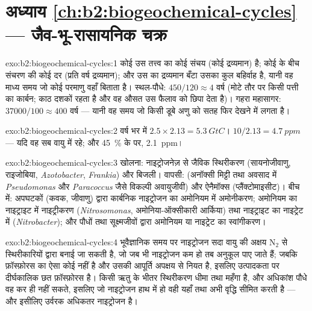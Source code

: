 \section*{अध्याय \ref{ch:b2:biogeochemical-cycles} --- जैव-भू-रासायनिक चक्र}

\begin{solution}{exo:b2:biogeochemical-cycles:1}
कोई  उस तत्त्व का कोई संचय (कोई द्रव्यमान) है; कोई 
 के बीच संचरण की कोई दर (प्रति वर्ष द्रव्यमान); और 
उस  का द्रव्यमान बँटा उसका कुल बहिर्वाह है, यानी वह माध्य समय जो कोई
परमाणु वहाँ बिताता है। स्थल-पौधे: $450/120 \approx 4$ वर्ष (मोटे तौर पर किसी पत्ती का
कार्बन; काठ दशकों रहता है और वह औसत उस
फैलाव को छिपा देता है)। गहरा महासागर: $37000/100 \approx 400$ वर्ष --- यानी वह समय
जो किसी डूबे अणु को सतह फिर देखने में लगता है।
\end{solution}

\begin{solution}{exo:b2:biogeochemical-cycles:2}
वर्ष भर में $2.5\times 2.13 = \qty{5.3}{GtC}$। $10/2.13 = \qty{4.7}{ppm}$
--- यदि वह सब वायु में रहे; और \qty{45}{\%} के  पर, \qty{2.1}{ppm}।
\end{solution}

\begin{solution}{exo:b2:biogeochemical-cycles:3}
खोलना: नाइट्रोजनेज़ से जैविक स्थिरीकरण (सायनोजीवाणु,
राइजोबिया, \emph{Azotobacter}, \emph{Frankia}) और बिजली। वापसी:
 (अनॉक्सी मिट्टी तथा अवसाद में \emph{Pseudomonas}
और \emph{Paracoccus} जैसे विकल्पी अवायुजीवी) और ऐनैमॉक्स
(प्लैंक्टोमाइसीट)। बीच में: अपघटकों (कवक, जीवाणु) द्वारा कार्बनिक नाइट्रोजन का
अमोनियम में अमोनीकरण; अमोनियम का
नाइट्राइट में नाइट्रीकरण (\emph{Nitrosomonas}, अमोनिया-ऑक्सीकारी
आर्किया) तथा नाइट्राइट का नाइट्रेट में (\emph{Nitrobacter}); और
पौधों तथा सूक्ष्मजीवों द्वारा अमोनियम या नाइट्रेट का स्वांगीकरण।
\end{solution}

\begin{solution}{exo:b2:biogeochemical-cycles:4}
भूवैज्ञानिक समय पर नाइट्रोजन सदा वायु की
अक्षय $\mathrm{N_2}$ से स्थिरीकारियों द्वारा बनाई जा सकती है, जो जब भी नाइट्रोजन कम हो तब
अनुकूल पाए जाते हैं; जबकि फ़ॉस्फ़ोरस का ऐसा कोई  नहीं है और
उसकी आपूर्ति अपक्षय से नियत है, इसलिए उत्पादकता पर दीर्घकालिक छत
फ़ॉस्फ़ोरस है। किसी ऋतु के भीतर स्थिरीकरण धीमा तथा
महँगा है, और अधिकांश पौधे वह कर ही नहीं सकते, इसलिए जो नाइट्रोजन हाथ में हो वही
यहाँ तथा अभी वृद्धि सीमित करती है --- और इसीलिए उर्वरक
अधिकतर नाइट्रोजन है।
\end{solution}

